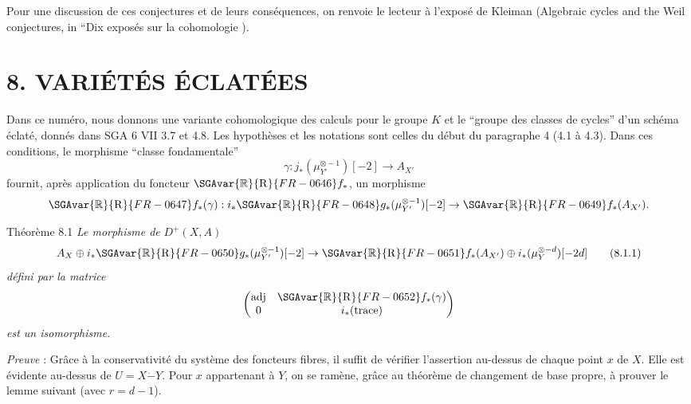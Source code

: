 Pour une discussion de ces conjectures et de leurs conséquences, on renvoie le lecteur à l'exposé de Kleiman (Algebraic cycles and the Weil conjectures, in ``Dix exposés sur la cohomologie  ).

\section*{8. VARIÉTÉS ÉCLATÉES}

Dans ce numéro, nous donnons une variante cohomologique des calculs pour le groupe $K$ et le ``groupe des classes de cycles'' d'un schéma éclaté, donnés dans SGA 6 VII 3.7 et 4.8. Les hypothèses et les notations sont celles du début du paragraphe 4 (4.1 à 4.3). Dans ces conditions, le morphisme ``classe fondamentale''
\[
\gamma:j_*(\mu_{Y'}^{\otimes -1})[-2]\to A_{X'}
\]
fournit, après application du foncteur $\SGAvar{\mathbb{R}}{\mathrm{R}}{FR-0646} f_*$, un morphisme
\[
\SGAvar{\mathbb{R}}{\mathrm{R}}{FR-0647} f_*(\gamma):i_*\SGAvar{\mathbb{R}}{\mathrm{R}}{FR-0648} g_*(\mu_{Y'}^{\otimes -1})[-2]\to \SGAvar{\mathbb{R}}{\mathrm{R}}{FR-0649} f_*(A_{X'}).
\]

\begin{statement}{Théorème 8.1}
\emph{Le morphisme de} $D^+(X,A)$
\[
A_X\oplus i_*\SGAvar{\mathbb{R}}{\mathrm{R}}{FR-0650} g_*(\mu_{Y'}^{\otimes -1})[-2]\to
\SGAvar{\mathbb{R}}{\mathrm{R}}{FR-0651} f_*(A_{X'})\oplus i_*(\mu_Y^{\otimes -d})[-2d]
\tag{8.1.1}
\]
\emph{défini par la matrice}
\[
\begin{pmatrix}
\operatorname{adj}&\SGAvar{\mathbb{R}}{\mathrm{R}}{FR-0652} f_*(\gamma)\\
0&i_*(\operatorname{trace})
\end{pmatrix}
\]
\emph{est un isomorphisme}.
\end{statement}

\emph{Preuve} : Grâce à la conservativité du système des foncteurs fibres, il suffit de vérifier l'assertion au-dessus de chaque point $x$ de $X$. Elle est évidente au-dessus de $U=X\mathbin{\dot{-}}Y$. Pour $x$ appartenant à $Y$, on se ramène, grâce au théorème de changement de base propre, à prouver le lemme suivant (avec $r=d-1$).

